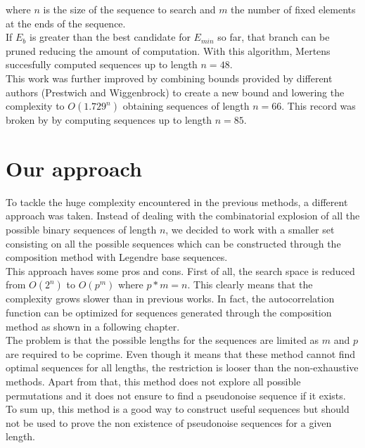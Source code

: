   where $n$ is the size of the sequence to search and $m$ the number of fixed
  elements at the ends of the sequence.\\

  If $E_b$ is greater than the best candidate for $E_{min}$ so far, that branch
  can be pruned reducing the amount of computation. With this algorithm,
  Mertens succesfully computed sequences up to length $n = 48$.\\

  This work was further improved by \citet{Packebusch_2016} combining bounds provided by different authors (Prestwich and
  Wiggenbrock) to create a new bound and  lowering the
  complexity to $O(1.729^n)$ obtaining sequences of length  $n= 66$. This
  record was broken by \citet{anatoli} by computing sequences up to length $n = 85$.\\

  \section{Our approach}

  To tackle the huge complexity encountered in the previous methods, a different
  approach was taken. Instead of dealing with the combinatorial explosion
  of all the possible binary sequences of length $n$, we decided to work with
  a smaller set consisting on all the possible sequences which can be
  constructed through the composition method with Legendre base sequences.\\

  This approach haves some pros and cons. First of all, the search space is
  reduced from $O(2^n)$ to $O(p^m)$ where $p*m = n$. This clearly means that
  the complexity grows slower than in previous works. In fact, the
  autocorrelation function can be optimized for sequences generated through the
  composition method as shown in a following chapter. \\

  The problem is that the possible lengths for the sequences are limited as $m$
  and $p$ are required to be coprime. Even though it means that
  these method cannot find optimal sequences for all lengths, the restriction is
  looser than the non-exhaustive methods. Apart from that, this method does not 
  explore all possible permutations and it does not ensure to find a pseudonoise
  sequence if it exists. To sum up, this method is a good way to construct useful sequences but should not
  be used to prove the non existence of pseudonoise sequences for a given
  length.\\

